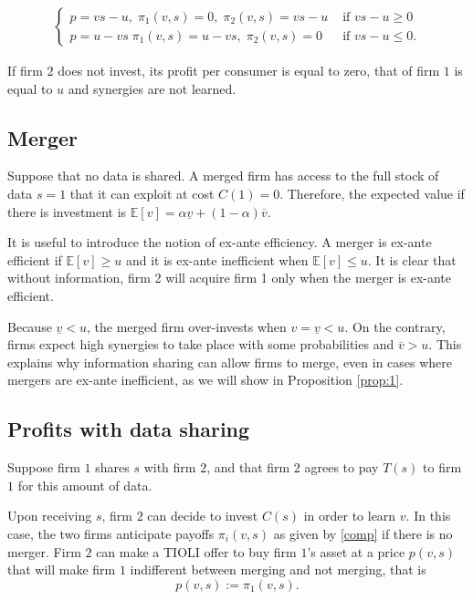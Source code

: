 \documentclass[a4paper,leqno]{article}%
\newcommand{\E}{\mathbb E}
\renewcommand{\a}{\alpha}
\newcommand{\uv}{\underline{v}}
\newcommand{\ov}{\overline{v}}
\begin{document}
\begin{align}\label{comp}
\begin{cases}
    p=vs-u,\; \pi_1(v,s)=0,\; \pi_2(v,s)=vs-u & \text{ if }vs-u\geq 0\\ 
    p=u-vs\; \pi_1(v,s)=u-vs,\; \pi_2(v,s)=0 & \text{ if }vs-u\leq 0.
\end{cases}
\end{align}

If firm $2$ does not invest, its profit per consumer is equal to zero, that of firm $1$ is equal to $u$ and synergies are not learned.


\subsection{Merger}
%
Suppose that no data is shared. A merged firm has access to the full stock of data $s=1$ that it can exploit at cost $C(1)=0$. Therefore, the expected value if there is investment is $\E[v]=\a \uv+(1-\a)\ov$.

It is useful to introduce the notion of ex-ante efficiency. A merger is ex-ante efficient if $\E[v]\geq u$ and it is ex-ante inefficient when $\E[v]\leq u$. It is clear that without information, firm 2 will acquire firm 1 only when the merger is ex-ante efficient. 


Because $\uv<u$, the merged firm over-invests when $v=\uv<u$. On the contrary, firms expect high synergies to take place with some probabilities and $\ov>u$. This explains why information sharing can allow firms to merge, even in cases where mergers are ex-ante inefficient, as we will show in Proposition \ref{prop:1}. 

\subsection{Profits with data sharing}

Suppose firm $1$ shares $s$ with firm $2$, and that firm $2$ agrees to pay $T(s)$ to firm $1$ for this amount of data. 

Upon receiving $s$, firm $2$ can decide to invest $C(s)$ in order to learn $v$. In this case, the two firms anticipate payoffs $\pi_i(v,s)$ as given by \eqref{comp} if there is no merger. Firm $2$ can make a TIOLI offer to buy firm $1$'s asset at a price $p(v,s)$ that will make firm $1$ indifferent between merging and not merging, that is 
%
\begin{equation}\label{merger-price}
    p(v,s):=\pi_1(v,s).  
\end{equation}
%
\end{document}

